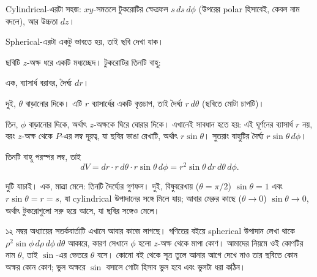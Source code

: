\documentclass[11pt]{article}
\begin{document}
Cylindrical-এরটা সহজ: $xy$-সমতলে টুকরোটির ক্ষেত্রফল $s\,ds\,d\phi$ (উপরের
polar হিসাবেই, কেবল নাম বদলে), আর উচ্চতা $dz$।

Spherical-এরটা একটু ভাবতে হয়, তাই ছবি দেখা যাক।

\begin{center}
\end{center}

ছবিটি $z$-অক্ষ ধরে একটি মধ্যচ্ছেদ। টুকরোটির তিনটি বাহু:

এক, ব্যাসার্ধ বরাবর, দৈর্ঘ্য $dr$।

দুই, $\theta$ বাড়ানোর দিকে। এটি $r$ ব্যাসার্ধের একটি বৃত্তচাপ, তাই দৈর্ঘ্য
$r\,d\theta$ (ছবিতে মোটা চাপটি)।

তিন, $\phi$ বাড়ানোর দিকে, অর্থাৎ $z$-অক্ষকে ঘিরে ঘোরার দিকে। এখানেই সাবধান
হতে হয়: এই ঘূর্ণনের ব্যাসার্ধ $r$ নয়, বরং $z$-অক্ষ থেকে $P$-এর লম্ব দূরত্ব,
যা ছবির ভাঙা রেখাটি, অর্থাৎ $r\sin\theta$। সুতরাং বাহুটির দৈর্ঘ্য
$r\sin\theta\,d\phi$।

তিনটি বাহু পরস্পর লম্ব, তাই
\[
  dV = dr \cdot r\,d\theta \cdot r\sin\theta\,d\phi
     = r^{2}\sin\theta\,dr\,d\theta\,d\phi .
\]

দুটি যাচাই। এক, মাত্রা মেলে: তিনটি দৈর্ঘ্যের গুণফল। দুই, বিষুবরেখায়
($\theta = \pi/2$) $\sin\theta = 1$ এবং $r\sin\theta = r = s$, যা cylindrical
উপাদানের সঙ্গে মিলে যায়; আবার মেরুর কাছে ($\theta \to 0$) $\sin\theta \to 0$,
অর্থাৎ টুকরোগুলো সরু হয়ে আসে, যা ছবির সঙ্গেও মেলে।

\begin{remark}
১২ নম্বর অধ্যায়ের সতর্কবার্তাটি এখানে আবার কাজে লাগছে। গণিতের বইয়ে
spherical উপাদান লেখা থাকে $\rho^{2}\sin\phi\,d\rho\,d\phi\,d\theta$ আকারে,
কারণ সেখানে $\phi$ হলো $z$-অক্ষ থেকে মাপা কোণ। আমাদের নিয়মে ওই কোণটির নাম
$\theta$, তাই $\sin$-এর ভেতরে $\theta$ বসে। কোনো বই থেকে সূত্র তুলে আনার
আগে দেখে নাও তার ছবিতে কোন অক্ষর কোন কোণ; ভুল অক্ষরে $\sin$ বসালে গোটা হিসাব
ভুল হবে এবং ভুলটা ধরা কঠিন।
\end{remark}
\end{document}
